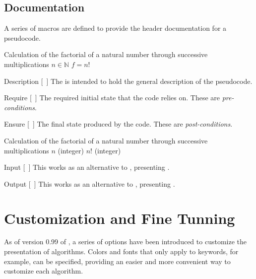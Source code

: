\documentclass[a4paper, 11pt]{article}
\begin{document}
\subsection{Documentation}\label{sec:documentation}
A series of macros are defined to provide the header documentation for a pseudocode.

\begin{tcblisting}{}
    \begin{algorithmic}
        \Description Calculation of the factorial of a natural number through successive multiplications
        \Require $n \in \mathbb{N}$
        \Ensure $f = n!$
    \end{algorithmic}
\end{tcblisting}

\begin{macro}{Description}
    [~]
    The  is intended to hold the general description of the pseudocode.
\end{macro}

\begin{macro}{Require}
    [~]
    The required initial state that the code relies on. These are \textit{pre-conditions}.
\end{macro}

\begin{macro}{Ensure}
    [~]
    The final state produced by the code. These are \textit{post-conditions}.
\end{macro}

\begin{tcblisting}{}
    \begin{algorithmic}
        \Description Calculation of the factorial of a natural number through successive multiplications
        \Input $n$ (integer)
        \Output $n!$ (integer)
    \end{algorithmic}
\end{tcblisting}

\begin{macro}{Input}
    [~]
    This works as an alternative to , presenting .
\end{macro}
\begin{macro}{Output}
    [~]
    This works as an alternative to , presenting .
\end{macro}


\section{Customization and Fine Tunning}\label{sec:customization-and-fine-tunning}
As of version 0.99 of , a series of options have been introduced to customize the presentation of algorithms. Colors and fonts that only apply to keywords, for example, can be specified, providing an easier and more convenient way to customize each algorithm.
\end{document}

